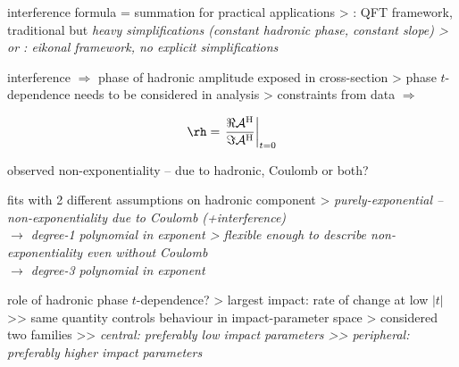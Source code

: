 \vskip10mm

\> interference formula = summation for practical applications
\>> : QFT framework, traditional but \em{heavy simplifications (constant hadronic phase, constant slope})
\>>  or : eikonal framework, no explicit simplifications

\> interference $\Rightarrow$ phase of hadronic amplitude exposed in cross-section
\>> phase $t$-dependence needs to be considered in analysis
\>> constraints from data $\Rightarrow$ 

\vskip-3mm
\cThird
$$\rh = \left. {\Re {\cal A}^{\rm H}\over \Im {\cal A}^{\rm H}} \right|_{t=0}$$


\newpage %

\centerline{}
\centerline{observed non-exponentiality -- due to hadronic, Coulomb or both?}

\vfil

\> fits with 2 different assumptions on hadronic component
\>> \em{purely-exponential} -- non-exponentiality due to Coulomb (+interference)\\
$\rightarrow$ degree-1 polynomial in exponent
\>> \em{flexible enough} to describe non-exponentiality even without Coulomb\\
$\rightarrow$ degree-3 polynomial in exponent

\vfil

\> role of hadronic phase $t$-dependence?
\>> largest impact: rate of change at low $|t|$
\>>> same quantity controls behaviour in impact-parameter space
\>> considered two families
\>>> \em{central}: preferably low impact parameters
\>>> \em{peripheral}: preferably higher impact parameters

\newpage %

\SmallerFonts


